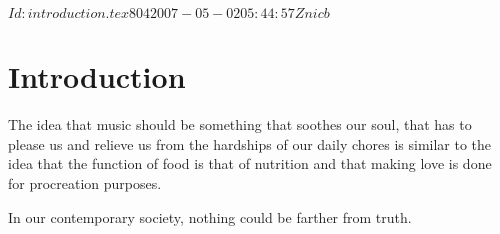 %
%
%
%
%
%
%
\svnInfo $Id: introduction.tex 804 2007-05-02 05:44:57Z nicb $

\section{Introduction}

The idea that music should be something that soothes our soul, that has to
please us and relieve us from the hardships of our daily chores is similar to
the idea that the function of food is that of nutrition and
that making love is done for procreation purposes.

In our contemporary society, nothing could be farther from truth.
